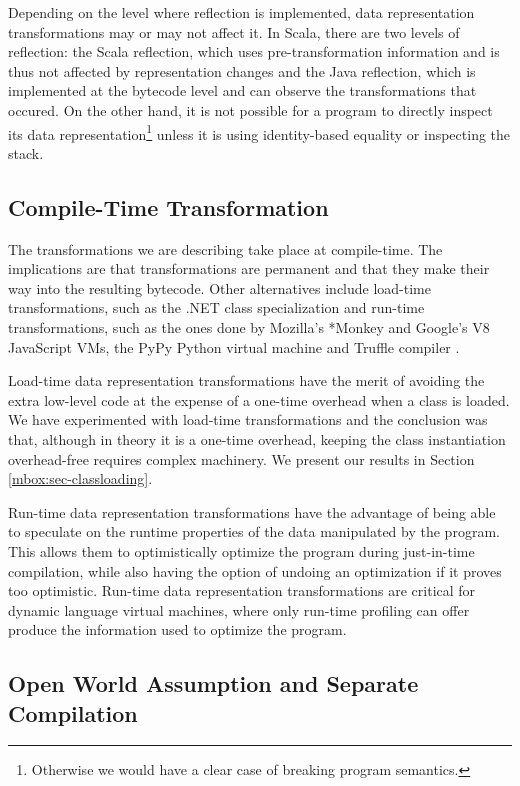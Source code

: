 Depending on the level where reflection is implemented, data representation transformations may or may not affect it. In Scala, there are two levels of reflection: the Scala reflection, which uses pre-transformation information and is thus not affected by representation changes and the Java reflection, which is implemented at the bytecode level and can observe the transformations that occured. On the other hand, it is not possible for a program to directly inspect its data representation\footnote{Otherwise we would have a clear case of breaking program semantics.} unless it is using identity-based equality or inspecting the stack.

\subsection{Compile-Time Transformation}

The transformations we are describing take place at compile-time. The implications are that transformations are permanent and that they make their way into the resulting bytecode. Other alternatives include load-time transformations, such as the .NET class specialization \cite{dot-net-generics} and run-time transformations, such as the ones done by Mozilla's *Monkey \cite{tracemonkey} and Google's V8 JavaScript VMs, the PyPy Python virtual machine \cite{bolz-pypy-tracing-jit} and Truffle compiler \cite{truffle}.

Load-time data representation transformations have the merit of avoiding the extra low-level code at the expense of a one-time overhead when a class is loaded. We have experimented with load-time transformations and the conclusion was that, although in theory it is a one-time overhead, keeping the class instantiation overhead-free requires complex machinery. We present our results in Section \ref{mbox:sec-classloading}.

Run-time data representation transformations have the advantage of being able to speculate on the runtime properties of the data manipulated by the program. This allows them to optimistically optimize the program during just-in-time compilation, while also having the option of undoing an optimization if it proves too optimistic. Run-time data representation transformations are critical for dynamic language virtual machines, where only run-time profiling can offer produce the information used to optimize the program.

\subsection{Open World Assumption and Separate Compilation}

